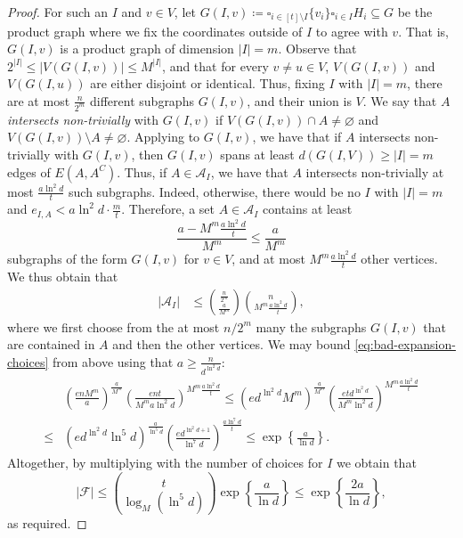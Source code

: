 \documentclass[notitlepage]{scrartcl}
\begin{document}
\begin{proof}
For such an $I$ and $v\in V$, let $G(I,v)\coloneqq \square_{i\in [t]\setminus I}\{v_i\} \square_{i\in I}H_i\subseteq G$ be the product graph where we fix the coordinates outside of $I$ to agree with $v$. That is, $G(I, v)$ is a product graph of dimension $|I|=m$. Observe that $2^{|I|}\le|V(G(I,v))|\le M^{|I|}$, and that for every $v\neq u\in V$, $V(G(I,v))$ and $V(G(I,u))$ are either disjoint or identical. Thus, fixing $I$ with $|I|=m$, there are at most $\frac{n}{2^m}$ different subgraphs $G(I,v)$, and their union is $V$. We say that $A$ \textit{intersects non-trivially} with $G(I,v)$ if $V(G(I,v))\cap A\neq \varnothing$ and $V(G(I,v))\setminus A\neq \varnothing$.
Applying  to $G(I, v)$, we have that if $A$ intersects non-trivially with $G(I,v)$, then $G(I,v)$ spans at least $d(G(I, V)) \geq |I|=m$ edges of $E(A,A^C)$. Thus, if $A\in \mathcal{A}_I$, we have that $A$ intersects non-trivially at most $\frac{a\ln^2d}{t}$ such subgraphs. Indeed, otherwise, there would be no $I$ with $|I|=m$ and $e_{I,A}<a\ln^2d\cdot \frac{m}{t}$. Therefore, a set $A\in \mathcal{A}_I$ contains at least $$\frac{a-M^m\frac{a\ln^2d}{t}}{M^m} \leq \frac{a}{M^m}$$ subgraphs of the form $G(I, v)$ for $v \in V$, and at most $M^m\frac{a\ln^2d}{t}$ other vertices. We thus obtain that
\begin{align} \label{eq:bad-expansion-choices}
    |\mathcal{A}_I|&\le \binom{\frac{n}{2^m}}{\frac{a}{M^m}}\binom{n}{M^m\frac{a\ln^2d}{t}},
\end{align}
where we first choose from the at most $n/2^m$ many the subgraphs $G(I, v)$ that are contained in $A$ and then the other vertices.
We may bound \eqref{eq:bad-expansion-choices} from above using that $a \geq \frac{n}{d^{\ln^2 d}}$:
\begin{align*}
    &\left(\frac{enM^m}{a}\right)^{\frac{a}{M^m}}\left(\frac{ent}{M^m a\ln^2d}\right)^{M^m\frac{a\ln^2d}{t}}
    \le \left(ed^{\ln^2d}M^m\right)^{\frac{a}{M^m}}\left(\frac{etd^{\ln^2d}}{M^m\ln^2d}\right)^{M^m\frac{a\ln^2d}{t}}\\
    \le&\left(ed^{\ln^2d}\ln^5 d\right)^{\frac{a}{\ln^5d}}\left(\frac{ed^{\ln^2d+1}}{\ln^7d}\right)^{\frac{a\ln^7d}{t}}
    \le \exp\left\{\frac{a}{\ln d}\right\}.
\end{align*}
Altogether, by multiplying with the number of choices for $I$ we obtain that 
\[
|\mathcal{F}|\le \binom{t}{\log_M(\ln^5d)}\exp\left\{\frac{a}{\ln d}\right\}\le \exp\left\{\frac{2a}{\ln d}\right\},
\]
as required.
\end{proof}
\end{document}
